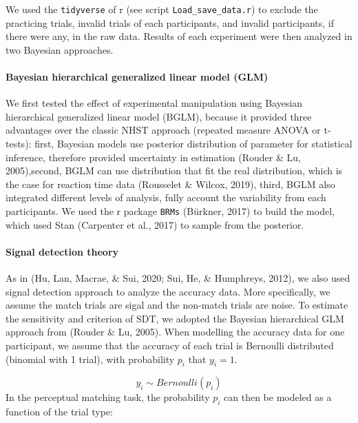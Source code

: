 \documentclass[
  english,
  man]{apa6}
\let\oldparagraph\paragraph
\renewcommand{\paragraph}[1]{\oldparagraph{#1}\mbox{}}
\begin{document}
We used the \texttt{tidyverse} of r (see script \texttt{Load\_save\_data.r}) to exclude the practicing trials, invalid trials of each participants, and invalid participants, if there were any, in the raw data. Results of each experiment were then analyzed in two Bayesian approaches.

\hypertarget{bayesian-hierarchical-generalized-linear-model-glm}{%
\paragraph{Bayesian hierarchical generalized linear model (GLM)}\label{bayesian-hierarchical-generalized-linear-model-glm}}

We first tested the effect of experimental manipulation using Bayesian hierarchical generalized linear model (BGLM), because it provided three advantages over the classic NHST approach (repeated measure ANOVA or t-tests): first, Bayesian models use posterior distribution of parameter for statistical inference, therefore provided uncertainty in estimation (Rouder \& Lu, 2005),second, BGLM can use distribution that fit the real distribution, which is the case for reaction time data (Rousselet \& Wilcox, 2019), third, BGLM also integrated different levels of analysis, fully account the variability from each participants. We used the r package \texttt{BRMs} (Bürkner, 2017) to build the model, which used Stan (Carpenter et al., 2017) to sample from the posterior.

\hypertarget{signal-detection-theory}{%
\paragraph{Signal detection theory}\label{signal-detection-theory}}

As in (Hu, Lan, Macrae, \& Sui, 2020; Sui, He, \& Humphreys, 2012), we also used signal detection approach to analyze the accuracy data. More specifically, we assume the match trials are sigal and the non-match trials are noise. To estimate the sensitivity and criterion of SDT, we adopted the Bayesian hierarchical GLM approach from (Rouder \& Lu, 2005). When modelling the accuracy data for one participant, we assume that the accuracy of each trial is Bernoulli distributed (binomial with 1 trial), with probability \(p_{i}\) that \(y_{i} = 1\).

\[ y_{i} \sim Bernoulli(p_{i})\]
In the perceptual matching task, the probability \(p_{i}\) can then be modeled as a function of the trial type:
\end{document}
